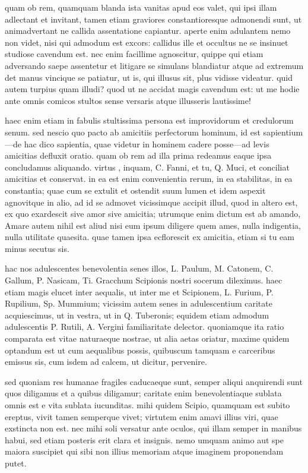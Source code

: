  quam ob rem, quamquam blanda ista vanitas apud eos valet, qui ipsi illam adlectant et invitant, tamen etiam graviores constantioresque admonendi sunt, ut animadvertant ne callida assentatione capiantur. aperte enim adulantem nemo non videt, nisi qui admodum est excors: callidus ille et occultus ne se insinuet studiose cavendum est. nec enim facillime agnoscitur, quippe qui etiam adversando saepe assentetur et litigare se simulans blandiatur atque ad extremum det manus vincique se patiatur, ut is, qui illusus sit, plus vidisse videatur. quid autem turpius quam illudi? quod ut ne accidat magis cavendum est: ut me hodie ante omnis comicos stultos sense versaris atque illusseris lautissime!

 haec enim etiam in fabulis stultissima persona est improvidorum et credulorum senum. sed nescio quo pacto ab amicitiis perfectorum hominum, id est sapientium—de hac dico sapientia, quae videtur in hominem cadere posse—ad levis amicitias defluxit oratio. quam ob rem ad illa prima redeamus eaque ipsa concludamus aliquando. virtus , inquam, C. Fanni, et tu, Q. Muci, et conciliat amicitias et conservat. in ea est enim convenientia rerum, in ea stabilitas, in ea constantia; quae cum se extulit et ostendit suum lumen et idem aspexit agnovitque in alio, ad id se admovet vicissimque accipit illud, quod in altero est, ex quo exardescit sive amor sive amicitia; utrumque enim dictum est ab amando, Amare autem nihil est aliud nisi eum ipsum diligere quem ames, nulla indigentia, nulla utilitate quaesita. quae tamen ipsa ecflorescit ex amicitia, etiam si tu eam minus secutus sis.

 hac nos adulescentes benevolentia senes illos, L. Paulum, M. Catonem, C. Gallum, P. Nasicam, Ti. Gracchum Scipionis nostri socerum dileximus. haec etiam magis elucet inter aequalis, ut inter me et Scipionem, L. Furium, P. Rupilium, Sp. Mummium; vicissim autem senes in adulescentium caritate acquiescimus, ut in vestra, ut in Q. Tuberonis; equidem etiam admodum adulescentis P. Rutili, A. Vergini familiaritate delector. quoniamque ita ratio comparata est vitae naturaeque nostrae, ut alia aetas oriatur, maxime quidem optandum est ut cum aequalibus possis, quibuscum tamquam e carceribus emissus sis, cum isdem ad calcem, ut dicitur, pervenire.

 sed quoniam res humanae fragiles caducaeque sunt, semper aliqui anquirendi sunt quos diligamus et a quibus diligamur; caritate enim benevolentiaque sublata omnis est e vita sublata iucunditas. mihi quidem Scipio, quamquam est subito ereptus, vivit tamen semperque vivet; virtutem enim amavi illius viri, quae exstincta non est. nec mihi soli versatur ante oculos, qui illam semper in manibus habui, sed etiam posteris erit clara et insignis. nemo umquam animo aut spe maiora suscipiet qui sibi non illius memoriam atque imaginem proponendam putet.


